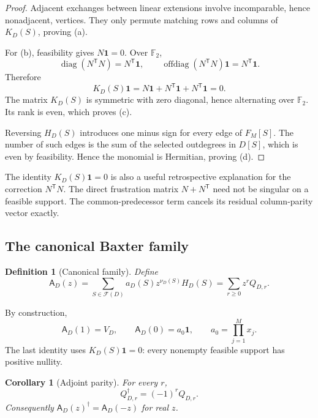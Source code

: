\documentclass[10pt,letterpaper]{article}
\newtheorem{corollary}[theorem]{Corollary}
\newtheorem{definition}[theorem]{Definition}
\newcommand{\Ffam}{\mathcal F}
\newcommand{\FF}{\mathbb F_2}
\newcommand{\one}{\mathbf 1}
\newcommand{\offdiag}{\operatorname{offdiag}}
\newcommand{\diag}{\operatorname{diag}}
\newcommand{\cA}{\mathsf A}
\begin{document}
\begin{proof}
Adjacent exchanges between linear extensions involve incomparable, hence nonadjacent, vertices.  They only permute matching rows and columns of \(K_D(S)\), proving (a).

For (b), feasibility gives \(N\one=0\).  Over \(\FF\),
\[
 \diag(N^{\mathsf T}N)=N^{\mathsf T}\one,
 \qquad
 \offdiag(N^{\mathsf T}N)\one=N^{\mathsf T}\one.
\]
Therefore
\[
 K_D(S)\one=N\one+N^{\mathsf T}\one+N^{\mathsf T}\one=0.
\]
The matrix \(K_D(S)\) is symmetric with zero diagonal, hence alternating over \(\FF\).  Its rank is even, which proves (c).

Reversing \(H_D(S)\) introduces one minus sign for every edge of \(F_M[S]\).  The number of such edges is the sum of the selected outdegrees in \(D[S]\), which is even by feasibility.  Hence the monomial is Hermitian, proving (d).
\end{proof}

The identity \(K_D(S)\one=0\) is also a useful retrospective explanation for the correction \(N^{\mathsf T}N\).  The direct frustration matrix \(N+N^{\mathsf T}\) need not be singular on a feasible support.  The common-predecessor term cancels its residual column-parity vector exactly.

\subsection{The canonical Baxter family}

\begin{definition}[Canonical family]\label{def:canonical-family}
Define
\begin{equation}\label{eq:canonical-A}
 \boxed{\displaystyle
 \cA_D(z)=\sum_{S\in\Ffam(D)}a_D(S)z^{\nu_D(S)}H_D(S)
 =\sum_{r\ge0}z^rQ_{D,r}.}
\end{equation}
\end{definition}
By construction,
\begin{equation}\label{eq:endpoints}
 \cA_D(1)=V_D,
 \qquad
 \cA_D(0)=a_0\one,
 \qquad
 a_0=\prod_{j=1}^M x_j.
\end{equation}
The last identity uses \(K_D(S)\one=0\): every nonempty feasible support has positive nullity.

\begin{corollary}[Adjoint parity]\label{cor:adjoint}
For every \(r\),
\begin{equation}\label{eq:charge-adjoint}
 Q_{D,r}^{\dagger}=(-1)^rQ_{D,r}.
\end{equation}
Consequently \(\cA_D(z)^\dagger=\cA_D(-z)\) for real \(z\).
\end{corollary}
\end{document}
